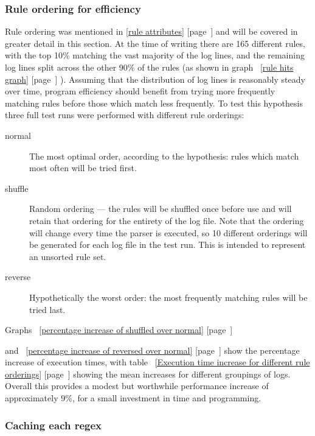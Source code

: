 \documentclass[a4paper,12pt,draft]{article}
\newcommand{\refwithpage}[1]{%
    \empty{}\ref{#1} [page~\pageref{#1}]%
}
\newcommand{\sectionref}[1]{%
    \textsection{}\refwithpage{#1}%
}
\newcommand{\numberOFrules}[0]{%
    165%
}
\begin{document}
\subsubsection{Rule ordering for efficiency}

\label{rule ordering for efficiency}

Rule ordering was mentioned in \sectionref{rule attributes} and will be
covered in greater detail in this section.  At the time of writing there
are \numberOFrules{} different rules, with the top 10\% matching the vast
majority of the log lines, and the remaining log lines split across the
other 90\% of the rules (as shown in graph~\refwithpage{rule hits graph}).
Assuming that the distribution of log lines is reasonably steady over time,
program efficiency should benefit from trying more frequently matching
rules before those which match less frequently.  To test this hypothesis
three full test runs were performed with different rule orderings:

\begin{description}

    \item [normal]  The most optimal order, according to the hypothesis:
        rules which match most often will be tried first.

    \item [shuffle] Random ordering --- the rules will be shuffled once
        before use and will retain that ordering for the entirety of the
        log file.  Note that the ordering will change every time the parser
        is executed, so 10 different orderings will be generated for each
        log file in the test run.  This is intended to represent an
        unsorted rule set.

    \item [reverse] Hypothetically the worst order: the most frequently
        matching rules will be tried last.

\end{description}

Graphs~\refwithpage{percentage increase of shuffled over normal}
and~\refwithpage{percentage increase of reversed over normal} show the
percentage increase of execution times, with table~\refwithpage{Execution
time increase for different rule orderings} showing the mean increases for
different groupings of logs.  Overall this provides a modest but worthwhile
performance increase of approximately 9\%, for a small investment in time
and programming.

\subsubsection{Caching each regex}
\end{document}

